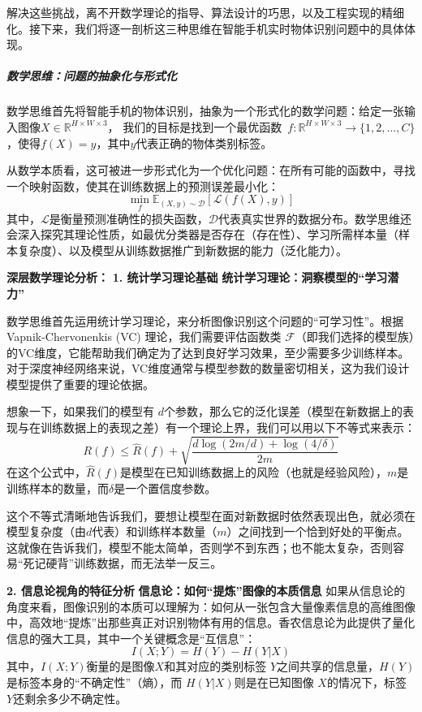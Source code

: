 解决这些挑战，离不开数学理论的指导、算法设计的巧思，以及工程实现的精细化。接下来，我们将逐一剖析这三种思维在智能手机实时物体识别问题中的具体体现。

\subparagraph{数学思维：问题的抽象化与形式化}

数学思维首先将智能手机的物体识别，抽象为一个形式化的数学问题：给定一张输入图像$X \in \mathbb{R}^{H \times W \times 3}$，
我们的目标是找到一个最优函数~$f: \mathbb{R}^{H \times W \times 3} \rightarrow \{1, 2, ..., C\}$，使得$f(X) = y$，其中$y$代表正确的物体类别标签。

从数学本质看，这可被进一步形式化为一个优化问题：在所有可能的函数中，寻找一个映射函数，使其在训练数据上的预测误差最小化：
$$\min_{f} \mathbb{E}_{(X,y) \sim \mathcal{D}}[\mathcal{L}(f(X), y)]$$
其中，$\mathcal{L}$是衡量预测准确性的损失函数，$\mathcal{D}$代表真实世界的数据分布。数学思维还会深入探究其理论性质，如最优分类器是否存在（存在性）、学习所需样本量（样本复杂度）、以及模型从训练数据推广到新数据的能力（泛化能力）。
 
\textbf{深层数学理论分析：}
\textbf{1. 统计学习理论基础}
\textbf{统计学习理论：洞察模型的“学习潜力”}

数学思维首先运用统计学习理论，来分析图像识别这个问题的“可学习性”。根据 Vapnik-Chervonenkis (VC) 理论，我们需要评估函数类 $\mathcal{F}$（即我们选择的模型族）的VC维度，它能帮助我们确定为了达到良好学习效果，至少需要多少训练样本。对于深度神经网络来说，VC维度通常与模型参数的数量密切相关，这为我们设计模型提供了重要的理论依据。

想象一下，如果我们的模型有 $d$个参数，那么它的泛化误差（模型在新数据上的表现与在训练数据上的表现之差）有一个理论上界，我们可以用以下不等式来表示：
$$R(f) \leq \hat{R}(f) + \sqrt{\frac{d \log(2m/d) + \log(4/\delta)}{2m}}$$
在这个公式中，$\hat{R}(f)$是模型在已知训练数据上的风险（也就是经验风险），$m$是训练样本的数量，而$\delta$是一个置信度参数。

这个不等式清晰地告诉我们，要想让模型在面对新数据时依然表现出色，就必须在模型复杂度（由$d$代表）和训练样本数量（$m$）之间找到一个恰到好处的平衡点。这就像在告诉我们，模型不能太简单，否则学不到东西；也不能太复杂，否则容易“死记硬背”训练数据，而无法举一反三。
 
 \textbf{2. 信息论视角的特征分析}
\textbf{信息论：如何“提炼”图像的本质信息}
如果从信息论的角度来看，图像识别的本质可以理解为：如何从一张包含大量像素信息的高维图像中，高效地“提炼”出那些真正对识别物体有用的信息。香农信息论为此提供了量化信息的强大工具，其中一个关键概念是“互信息”：
$$I(X; Y) = H(Y) - H(Y|X)$$
其中，$I(X; Y)$衡量的是图像$X$和其对应的类别标签 $Y$之间共享的信息量，$H(Y)$ 是标签本身的“不确定性”（熵），而 $H(Y|X)$则是在已知图像 $X$的情况下，标签 $Y$还剩余多少不确定性。

